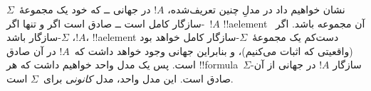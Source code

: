 \documentclass[../../../include/open-logic-section]{subfiles}
\begin{document}
نشان خواهیم داد در مدلِ چنین تعریف‌شده، $!A$ در جهانی ــ که خود یک
مجموعهٔ~$\Sigma$-سازگار کامل است ــ صادق است اگر و تنها اگر~$!A$
!!a{element} آن مجموعه باشد. اگر~$!A$، $\Sigma$-سازگار باشد،
!!a{element} دست‌کم یک مجموعهٔ~$\Sigma$-سازگار کامل خواهد بود (واقعیتی
که اثبات می‌کنیم)، و بنابراین جهانی وجود خواهد داشت که~$!A$ در آن
صادق است. پس یک مدل واحد خواهیم داشت که هر !!{formula}~$\Sigma$-سازگار
$!A$ در جهانی از آن صادق است. این مدل واحد، مدل \emph{کانونی}
برای~$\Sigma$ است.
\end{document}
